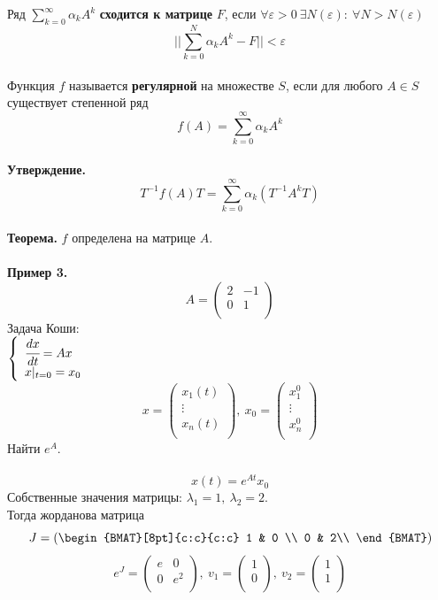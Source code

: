 \documentclass[12pt]{article}
\theoremstyle{definition}
\numberwithin{equation}{section}
\begin{document}
	Ряд $\sum\limits_{k=0}^{\infty}\alpha_kA^k$ \textbf{сходится к матрице} $F$, если $\forall \varepsilon >0~\exists N(\varepsilon):~\forall N>N(\varepsilon)$
	$$||\sum\limits_{k=0}^N\alpha_kA^k-F||<\varepsilon$$
	\\
	Функция $f$ называется \textbf{регулярной} на множестве $S$, если для любого $A\in S$ существует степенной ряд $$f(A)=\sum\limits_{k=0}^{\infty}\alpha_kA^k$$
	\\
	\textbf{Утверждение.} $$T^{-1}f(A)T=\sum\limits_{k=0}^{\infty}\alpha_k(T^{-1}A^kT)$$
	\\
	\textbf{Теорема.} $f$ определена на матрице $A$.
	\\
	\\
	\textbf{Пример 3.}\\
	\[A = \begin{pmatrix}
	2 & -1\\
	0 & 1\\
	\end{pmatrix}\]
	Задача Коши:\\
	$
	\left\{
	\begin{array}{lcl}
	\cfrac{dx}{dt}=Ax\\
	x|_{t=0}=x_0\\
	\end{array}
	\right.
	$
	\\
	\[x = \begin{pmatrix}
	x_1(t)\\
	\vdots\\
	x_n(t)\\
	\end{pmatrix},~x_0= \begin{pmatrix}
	x_1^0\\
	\vdots\\
	x_n^0\\
	\end{pmatrix}\]
	Найти $e^A$.\\
	\\
	$$x(t)=e^{At}x_0$$
	Собственные значения матрицы: $\lambda_1=1,~\lambda_2=2$.\\
	Тогда жорданова матрица
	\[J= \left(
	\begin{BMAT}[8pt]{c:c}{c:c}
	1 & 0 \\
	0 & 2\\
	\end{BMAT} \right)
	\]
	\[e^J = \begin{pmatrix}
	e & 0 \\
	0 & e^2\\
	\end{pmatrix},~v_1=\begin{pmatrix}
	1 \\
	0 \\
	\end{pmatrix},~v_2= \begin{pmatrix}
	1 \\
	1\\
	\end{pmatrix}\]
\end{document}
